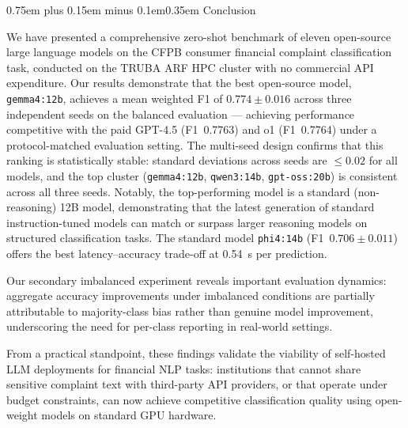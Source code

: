 \documentclass[10pt,a4paper,twocolumn]{article}
\makeatletter
\renewcommand\section{\@startsection{section}{1}{0pt}%
  {0.75em plus 0.15em minus 0.1em}{0.35em}%
  {\normalfont\normalsize\itshape}}
\makeatother
\begin{document}
\section{Conclusion}
\label{sec:conclusion}

We have presented a comprehensive zero-shot benchmark of eleven
open-source large language models on the CFPB consumer financial
complaint classification task, conducted on the TRUBA ARF HPC cluster
with no commercial API expenditure. Our results demonstrate that the
best open-source model, \texttt{gemma4:12b}, achieves a mean weighted
F1 of $0.774 \pm 0.016$ across three independent seeds on the balanced
evaluation --- achieving performance competitive with the paid GPT-4.5
(F1~0.7763) and o1 (F1~0.7764) under a protocol-matched evaluation
setting. The multi-seed design confirms that
this ranking is statistically stable: standard deviations across seeds
are $\leq 0.02$ for all models, and the top cluster
(\texttt{gemma4:12b}, \texttt{qwen3:14b}, \texttt{gpt-oss:20b})
is consistent across all three seeds. Notably, the top-performing
model is a standard (non-reasoning) 12B model, demonstrating that
the latest generation of standard instruction-tuned models can match
or surpass larger reasoning models on structured classification tasks.
The standard model \texttt{phi4:14b} (F1~$0.706 \pm 0.011$)
offers the best latency--accuracy trade-off at 0.54~s per prediction.

Our secondary imbalanced experiment reveals important evaluation
dynamics: aggregate accuracy improvements under imbalanced
conditions are partially attributable to majority-class bias
rather than genuine model improvement, underscoring the need for
per-class reporting in real-world settings.

From a practical standpoint, these findings validate the viability
of self-hosted LLM deployments for financial NLP tasks: institutions
that cannot share sensitive complaint text with third-party API
providers, or that operate under budget constraints, can now achieve
competitive classification quality using open-weight models on
standard GPU hardware.
\end{document}
